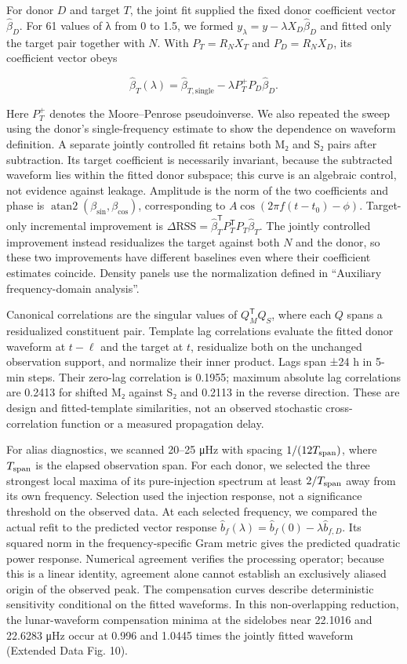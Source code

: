 \documentclass[
  11pt,
  a4paper,
]{article}
\begin{document}
For donor \(D\) and target \(T\), the joint fit supplied the fixed donor
coefficient vector \(\hat\beta_D\). For 61 values of λ from 0 to 1.5, we
formed \(y_\lambda=y-\lambda X_D\hat\beta_D\) and fitted only the target
pair together with \(N\). With \(P_T=R_NX_T\) and \(P_D=R_NX_D\), its
coefficient vector obeys

\[
\hat\beta_T(\lambda)=\hat\beta_{T,\mathrm{single}}-\lambda P_T^+P_D\hat\beta_D.
\]

Here \(P_T^+\) denotes the Moore--Penrose pseudoinverse. We also
repeated the sweep using the donor's single-frequency estimate to show
the dependence on waveform definition. A separate jointly controlled fit
retains both M₂ and S₂ pairs after subtraction. Its target coefficient
is necessarily invariant, because the subtracted waveform lies within
the fitted donor subspace; this curve is an algebraic control, not
evidence against leakage. Amplitude is the norm of the two coefficients
and phase is \(\operatorname{atan2}(\beta_{\sin},\beta_{\cos})\),
corresponding to \(A\cos(2\pi f(t-t_0)-\phi)\). Target-only incremental
improvement is
\(\Delta\mathrm{RSS}=\hat\beta_T^\mathsf TP_T^\mathsf TP_T\hat\beta_T\).
The jointly controlled improvement instead residualizes the target
against both \(N\) and the donor, so these two improvements have
different baselines even where their coefficient estimates coincide.
Density panels use the normalization defined in ``Auxiliary
frequency-domain analysis''.

Canonical correlations are the singular values of \(Q_M^\mathsf TQ_S\),
where each \(Q\) spans a residualized constituent pair. Template lag
correlations evaluate the fitted donor waveform at \(t-\ell\) and the
target at \(t\), residualize both on the unchanged observation support,
and normalize their inner product. Lags span ±24 h in 5-min steps. Their
zero-lag correlation is 0.1955; maximum absolute lag correlations are
0.2413 for shifted M₂ against S₂ and 0.2113 in the reverse direction.
These are design and fitted-template similarities, not an observed
stochastic cross-correlation function or a measured propagation delay.

For alias diagnostics, we scanned 20--25 μHz with spacing
\(1/(12T_{\rm span})\), where \(T_{\rm span}\) is the elapsed
observation span. For each donor, we selected the three strongest local
maxima of its pure-injection spectrum at least \(2/T_{\rm span}\) away
from its own frequency. Selection used the injection response, not a
significance threshold on the observed data. At each selected frequency,
we compared the actual refit to the predicted vector response
\(\hat b_f(\lambda)=\hat b_f(0)-\lambda\hat b_{f,D}\). Its squared norm
in the frequency-specific Gram metric gives the predicted quadratic
power response. Numerical agreement verifies the processing operator;
because this is a linear identity, agreement alone cannot establish an
exclusively aliased origin of the observed peak. The compensation curves
describe deterministic sensitivity conditional on the fitted waveforms.
In this non-overlapping reduction, the lunar-waveform compensation
minima at the sidelobes near 22.1016 and 22.6283 μHz occur at 0.996 and
1.0445 times the jointly fitted waveform (Extended Data Fig. 10).
\end{document}
